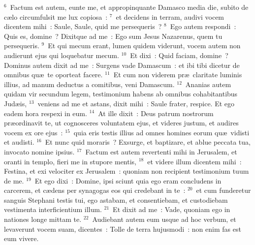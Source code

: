 ${}^{6}$~Factum est autem, eunte me, et appropinquante Damasco media die, subito de c\ae lo circumfulsit me lux copiosa~:
${}^{7}$~et decidens in terram, audivi vocem dicentem mihi~: Saule, Saule, quid me persequeris~?
${}^{8}$~Ego autem respondi~: Quis es, domine~? Dixitque ad me~: Ego sum Jesus Nazarenus, quem tu persequeris.
${}^{9}$~Et qui mecum erant, lumen quidem viderunt, vocem autem non audierunt ejus qui loquebatur mecum.
${}^{10}$~Et dixi~: Quid faciam, domine~? Dominus autem dixit ad me~: Surgens vade Damascum~: et ibi tibi dicetur de omnibus qu\ae\ te oporteat facere.
${}^{11}$~Et cum non viderem pr\ae\ claritate luminis illius, ad manum deductus a comitibus, veni Damascum.
${}^{12}$~Ananias autem quidam vir secundum legem, testimonium habens ab omnibus cohabitantibus Jud\ae is,
${}^{13}$~veniens ad me et astans, dixit mihi~: Saule frater, respice. Et ego eadem hora respexi in eum.
${}^{14}$~At ille dixit~: Deus patrum nostrorum pr\ae ordinavit te, ut cognosceres voluntatem ejus, et videres justum, et audires vocem ex ore ejus~:
${}^{15}$~quia eris testis illius ad omnes homines eorum qu\ae\ vidisti et audisti.
${}^{16}$~Et nunc quid moraris~? Exsurge, et baptizare, et ablue peccata tua, invocato nomine ipsius.
${}^{17}$~Factum est autem revertenti mihi in Jerusalem, et oranti in templo, fieri me in stupore mentis,
${}^{18}$~et videre illum dicentem mihi~: Festina, et exi velociter ex Jerusalem~: quoniam non recipient testimonium tuum de me.
${}^{19}$~Et ego dixi~: Domine, ipsi sciunt quia ego eram concludens in carcerem, et c\ae dens per synagogas eos qui credebant in te~:
${}^{20}$~et cum funderetur sanguis Stephani testis tui, ego astabam, et consentiebam, et custodiebam vestimenta interficientium illum.
${}^{21}$~Et dixit ad me~: Vade, quoniam ego in nationes longe mittam te.
${}^{22}$~Audiebant autem eum usque ad hoc verbum, et levaverunt vocem suam, dicentes~: Tolle de terra hujusmodi~: non enim fas est eum vivere.


